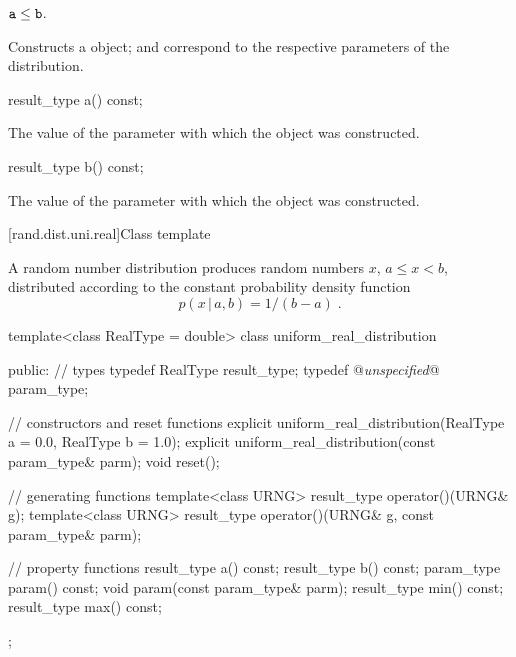 \begin{itemdescr}
\pnum\requires
 $ \texttt{a} \leq \texttt{b} $.

\pnum\effects Constructs a  object;
  and 
 correspond to the respective parameters of the distribution.
\end{itemdescr}

%
%
\begin{itemdecl}
result_type a() const;
\end{itemdecl}

\begin{itemdescr}
\pnum\returns The value of the  parameter
 with which the object was constructed.
\end{itemdescr}

%
%
\begin{itemdecl}
result_type b() const;
\end{itemdecl}

\begin{itemdescr}
\pnum\returns The value of the  parameter
 with which the object was constructed.
\end{itemdescr}


[rand.dist.uni.real]{Class template }%
%

\pnum
A  random number distribution
produces random numbers $x$,
$ a \leq x < b $,
distributed according to
the constant probability density function%
%
\[%
 p(x\,|\,a,b) = 1 / (b - a)
\; \mbox{.}
\]

\begin{codeblock}
template<class RealType = double>
 class uniform_real_distribution
{
public:
 // types
 typedef RealType result_type;
 typedef @\textit{unspecified}@ param_type;

 // constructors and reset functions
 explicit uniform_real_distribution(RealType a = 0.0, RealType b = 1.0);
 explicit uniform_real_distribution(const param_type& parm);
 void reset();

 // generating functions
 template<class URNG>
   result_type operator()(URNG& g);
 template<class URNG>
   result_type operator()(URNG& g, const param_type& parm);

 // property functions
 result_type a() const;
 result_type b() const;
 param_type param() const;
 void param(const param_type& parm);
 result_type min() const;
 result_type max() const;
};
\end{codeblock}


